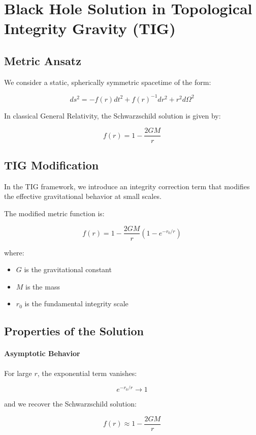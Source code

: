 \section{Black Hole Solution in Topological Integrity Gravity (TIG)}

\subsection{Metric Ansatz}

We consider a static, spherically symmetric spacetime of the form:

\[
ds^2 = -f(r) dt^2 + f(r)^{-1} dr^2 + r^2 d\Omega^2
\]

In classical General Relativity, the Schwarzschild solution is given by:

\[
f(r) = 1 - \frac{2GM}{r}
\]

\subsection{TIG Modification}

In the TIG framework, we introduce an integrity correction term that modifies the effective gravitational behavior at small scales.

The modified metric function is:

\[
f(r) = 1 - \frac{2GM}{r} \left(1 - e^{-r_0 / r}\right)
\]

where:
\begin{itemize}
\item $G$ is the gravitational constant
\item $M$ is the mass
\item $r_0$ is the fundamental integrity scale
\end{itemize}

\subsection{Properties of the Solution}

\paragraph{Asymptotic Behavior}

For large $r$, the exponential term vanishes:

\[
e^{-r_0 / r} \rightarrow 1
\]

and we recover the Schwarzschild solution:

\[
f(r) \approx 1 - \frac{2GM}{r}
\]

